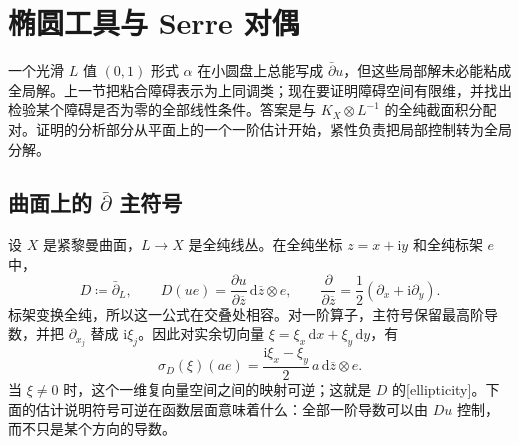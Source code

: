 
% 
% 

\section{椭圆工具与 Serre 对偶}
\label{g4:sec:0303}

一个光滑 \(L\) 值 \((0,1)\) 形式 \(\alpha\) 在小圆盘上总能写成 \(\bar\partial u\)，但这些局部解未必能粘成全局解。上一节把粘合障碍表示为上同调类；现在要证明障碍空间有限维，并找出检验某个障碍是否为零的全部线性条件。答案是与 \(K_X\otimes L^{-1}\) 的全纯截面积分配对。证明的分析部分从平面上的一个一阶估计开始，紧性负责把局部控制转为全局分解。

\subsection{\texorpdfstring{曲面上的 \(\bar{\partial}\) 主符号}{曲面上的 \={∂} 主符号}}
\label{g4:subsec:0303:01}
设 \(X\) 是紧黎曼曲面，\(L\to X\) 是全纯线丛。在全纯坐标 \(z=x+\mathrm{i}y\) 和全纯标架 \(e\) 中，
\[
	D\coloneqq\bar\partial_L,\qquad
	D(u e)=\frac{\partial u}{\partial\overline z}\,
	\mathrm{d}\overline z\otimes e,\qquad
	\frac{\partial}{\partial\overline z}
	=\frac12(\partial_x+\mathrm{i}\partial_y).
\]
标架变换全纯，所以这一公式在交叠处相容。对一阶算子，主符号保留最高阶导数，并把 \(\partial_{x_j}\) 替成 \(\mathrm{i}\xi_j\)。因此对实余切向量 \(\xi=\xi_x\,\mathrm{d}x+\xi_y\,\mathrm{d}y\)，有
\begin{equation}
	\label{g4:eq:0303:dbar-symbol}
	\sigma_D(\xi)(a e)
	=\frac{\mathrm{i}\xi_x-\xi_y}{2}\,
	a\,\mathrm{d}\overline z\otimes e.
\end{equation}
当 \(\xi\ne0\) 时，这个一维复向量空间之间的映射可逆；这就是 \(D\) 的[ellipticity]。下面的估计说明符号可逆在函数层面意味着什么：全部一阶导数可以由 \(Du\) 控制，而不只是某个方向的导数。

